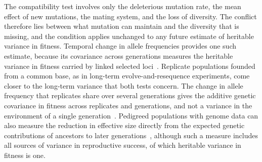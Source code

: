 \documentclass{article}
\begin{document}
The compatibility test involves only the deleterious mutation rate, the mean effect of new mutations, the mating system, and the loss of diversity. The conflict therefore lies between what mutation can maintain and the diversity that is missing, and the condition applies unchanged to any future estimate of heritable variance in fitness. Temporal change in allele frequencies provides one such estimate, because its covariance across generations measures the heritable variance in fitness carried by linked selected loci~\cite{buffalo2019,buffalo2020}. Replicate populations founded from a common base, as in long-term evolve-and-resequence experiments, come closer to the long-term variance that both tests concern. The change in allele frequency that replicates share over several generations gives the additive genetic covariance in fitness across replicates and generations, and not a variance in the environment of a single generation~\cite{geetaarun2026}. Pedigreed populations with genome data can also measure the reduction in effective size directly from the expected genetic contributions of ancestors to later generations~\cite{wray1990,chen2019}, although such a measure includes all sources of variance in reproductive success, of which heritable variance in fitness is one.

\ifdefined\isMainDocument
\else
    \printbibliography
    
\end{document}
